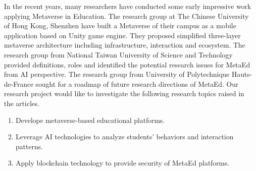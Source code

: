 \documentclass[
    ngerman,american
    ]{scrartcl}
\begin{document}
        In the recent years, many researchers have conducted some early impressive work applying Metaverse in Education. 
        The research group at The Chinese University of Hong Kong, Shenzhen \cite{duan_metaed_2021} have built a Metaverse of their campus as
        a mobile application based on Unity game engine. They proposed simplified three-layer metaverse architecture including infrastructure, interaction
        and ecosystem.  The research group from National Taiwan University of Science and Technology \cite{hwang_meta_ai_2022} 
        provided definitions, roles and identified the potential research issues for MetaEd from AI perspective. 
        The research group from University of Polytechnique Hauts-de-France \cite{tlili_metaed_2022} sought for a roadmap of future research directions of MetaEd.  
        Our research project would like to investigate the following research topics raised in the articles.
        \begin{enumerate}{}
        \item Develope metaverse-based educational platforms.
        \item Leverage AI technologies to analyze students' behaviors and interaction patterns.
        \item Apply blockchain technology to provide security of MetaEd platforms. 
        \end{enumerate}{}
        

      	
	\printbibliography
    
\end{document}
